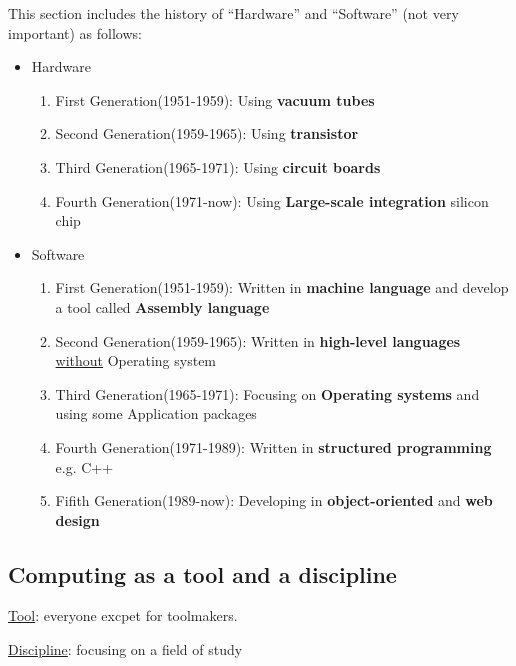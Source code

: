 \documentclass[12pt]{article}
\begin{document}
This section includes the history of ``Hardware'' and ``Software'' (not very important) as follows:
\begin{itemize}
    \item Hardware
    \begin{enumerate}
        \item First Generation(1951-1959): Using \textbf{vacuum tubes}
        \item Second Generation(1959-1965): Using \textbf{transistor} 
        \item Third Generation(1965-1971): Using \textbf{circuit boards}
        \item Fourth Generation(1971-now): Using \textbf{Large-scale integration} silicon chip
    \end{enumerate}
    \item Software
    \begin{enumerate}
        \item First Generation(1951-1959): Written in \textbf{machine language} and develop a tool called \textbf{Assembly language}
        \item Second Generation(1959-1965): Written in \textbf{high-level languages} \underline{without} Operating system
        \item Third Generation(1965-1971): Focusing on \textbf{Operating systems} and using some Application packages
        \item Fourth Generation(1971-1989): Written in \textbf{structured programming} e.g. C++
        \item Fifith Generation(1989-now): Developing in \textbf{object-oriented} and \textbf{web design}
    \end{enumerate}
\end{itemize}

\subsection{Computing as a tool and a discipline}
\underline{Tool}: everyone excpet for toolmakers.

\underline{Discipline}: focusing on a field of study
\end{document}
